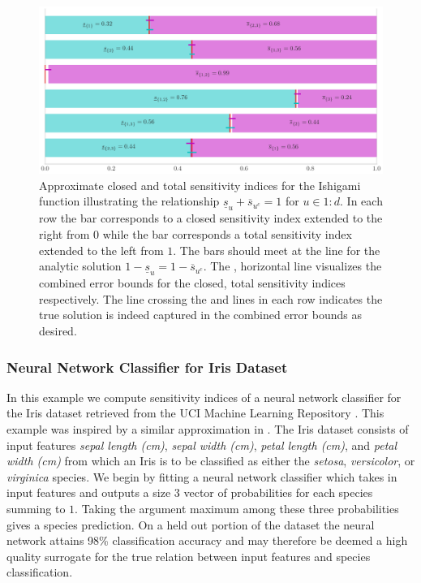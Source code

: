 \documentclass{article}[12pt]
\begin{document}
\begin{figure}[H]
    \centering
    \includegraphics[width=.8\textwidth]{figs/ishigami.pdf}
    \caption{Approximate closed and total sensitivity indices for the Ishigami function illustrating the relationship $\underline{s}_u + \overline{s}_{u^c} = 1$ for $u \in 1:d$. In each row the  bar corresponds to a closed sensitivity index extended to the right from $0$ while the  bar corresponds a total sensitivity index extended to the left from $1$. The bars should meet at the  line for the  analytic solution $1-\underline{s}_u=1-\overline{s}_{u^c}$. The ,  horizontal line visualizes the combined error bounds for the closed, total sensitivity indices respectively. The  line crossing the  and  lines in each row indicates the true solution is indeed captured in the combined error bounds as desired.}
    \label{fig:ishigami}
\end{figure}

\subsubsection{Neural Network Classifier for Iris Dataset}

In this example we compute sensitivity indices of a neural network classifier for the Iris dataset retrieved from the UCI Machine Learning Repository \cite{uci_ml_repo}. This example was inspired by a similar approximation in \cite{hoyt2021efficient}. The Iris dataset consists of input features \emph{sepal length (cm)}, \emph{sepal width (cm)}, \emph{petal length (cm)}, and \emph{petal width (cm)} from which an Iris is to be classified as either the \emph{setosa}, \emph{versicolor}, or \emph{virginica} species. We begin by fitting a neural network classifier \cite{he2015delving} which takes in input features and outputs a size $3$ vector of probabilities for each species summing to $1$. Taking the argument maximum among these three probabilities gives a species prediction. On a held out portion of the dataset the neural network attains 98\% classification accuracy and may therefore be deemed a high quality surrogate for the true relation between input features and species classification. 
\end{document}
